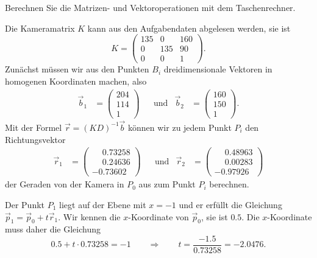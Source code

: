 \begin{hinweis}
Berechnen Sie die Matrizen- und Vektoroperationen mit dem Taschenrechner.
\end{hinweis}


\begin{loesung}
\begin{teilaufgaben}
\item
Die Kameramatrix $K$ kann aus den Aufgabendaten abgelesen werden, sie ist
\[
K
=
\begin{pmatrix}
135&  0&160\\
  0&135& 90\\
  0&  0&  1
\end{pmatrix}.
\]
Zunächst müssen wir aus den Punkten $B_i$ dreidimensionale Vektoren
in homogenen Koordinaten machen, also
\[
\begin{aligned}
\vec b_1 &= \begin{pmatrix}204\\114\\1\end{pmatrix}
&&\text{und}&
\vec b_2 &= \begin{pmatrix}160\\150\\1\end{pmatrix}.
\end{aligned}
\]
Mit der Formel $\vec{r} = (KD)^{-1} \vec b$ können wir zu jedem Punkt $P_i$
den Richtungsvektor
\[
\begin{aligned}
\vec r_1
&=
\begin{pmatrix}
\phantom{-}0.73258 \\
\phantom{-}0.24636 \\
-0.73602
\end{pmatrix}
&&\text{und}&
\vec r_2 &= \begin{pmatrix} 
\phantom{-}0.48963\\
\phantom{-}0.00283\\
         - 0.97926
\end{pmatrix}
\end{aligned}
\]
der Geraden von der Kamera in $P_0$ aus zum Punkt $P_i$ berechnen.

Der Punkt $P_1$ liegt auf der Ebene mit $x=-1$ und er erfüllt die
Gleichung $\vec{p}_1 = \vec{p}_0 + t\vec{r}_1$.
Wir kennen die $x$-Koordinate von $\vec{p}_0$, sie ist $0.5$.
Die $x$-Koordinate muss daher die Gleichung 
\[
0.5 + t\cdot 0.73258 = -1
\qquad\Rightarrow\qquad
t = \frac{-1.5}{0.73258}=-2.0476.
\]


\end{teilaufgaben}
\end{loesung}
